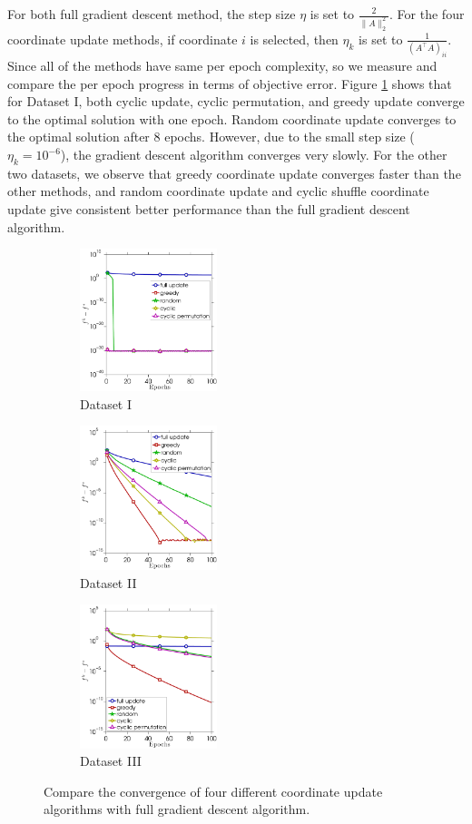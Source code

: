 {{For both full gradient descent method, the step size $\eta$ is set to $\frac{2}{\|A\|_2^2}$. For the four coordinate update methods, if coordinate $i$ is selected, then $\eta_k$ is set to $\frac{1}{(A^{\top}A)_{ii}}$. Since all of the methods have same per epoch complexity, so we measure and compare the per epoch progress in terms of objective error. Figure \ref{fig:ls_a} shows that for Dataset I, both cyclic update, cyclic permutation, and greedy update converge to the optimal solution with one epoch. Random coordinate update converges to the optimal solution after $8$ epochs. However, due to the small step size ($\eta_k = 10^{-6}$), the gradient descent algorithm converges very slowly. For the other two datasets, we observe that greedy coordinate update converges faster than the other methods, and random coordinate update and cyclic shuffle coordinate update give consistent better performance than the full gradient descent algorithm. 
\begin{figure}[!htbp] \centering
    \begin{subfigure}[b]{0.3\linewidth}
        \includegraphics[width=40mm]{./figs/diag_matrix_cropped.pdf}
        \caption{Dataset I}
        \label{fig:ls_a}
    \end{subfigure} %
    \quad
    \begin{subfigure}[b]{0.3\linewidth}
        \includegraphics[width=40mm]{./figs/randn_matrix_cropped.pdf}
        \caption{Dataset II}
        \label{fig:ls_b}
    \end{subfigure} %
    \quad
    \begin{subfigure}[b]{0.3\linewidth}
        \includegraphics[width=40mm]{./figs/rand_matrix_cropped.pdf}
        \caption{Dataset III}
        \label{fig:ls_c}
    \end{subfigure} %
    \caption{Compare the convergence of four different coordinate update algorithms with full gradient descent algorithm.}
    \label{fig:3s_results}
\end{figure}
}
}

